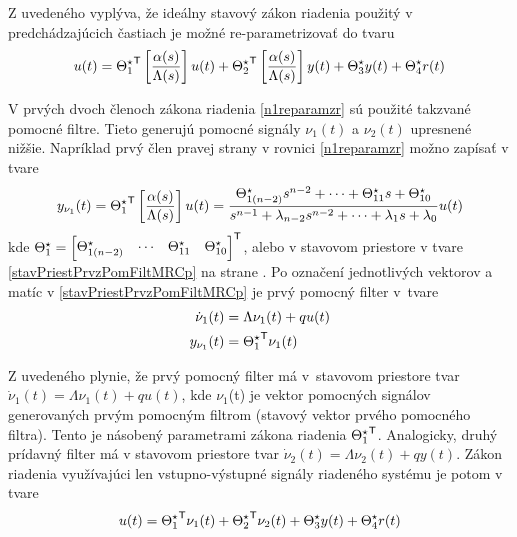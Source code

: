 \documentclass[a4paper, 10pt, ]{article}
\begin{document}
Z uvedeného vyplýva, že ideálny stavový zákon riadenia použitý v predchádzajúcich častiach je možné re-parametrizovať do tvaru
\begin{equation} \label{n1reparamzr}
	u(t)
	=
	{\Theta_1^\star}^{\mathsf{T}} \left[ \frac{\alpha(s)}{\Lambda(s)} \right] u(t)
	+
	{\Theta_2^\star}^{\mathsf{T}} \left[ \frac{\alpha(s)}{\Lambda(s)} \right] y(t)
	+
	\Theta_3^\star y(t)
	+
	\Theta_4^\star r(t)
\end{equation}






V prvých dvoch členoch zákona riadenia \eqref{n1reparamzr} sú použité takzvané pomocné filtre. Tieto generujú pomocné signály $\nu_1(t)$ a $\nu_2(t)$ upresnené nižšie. Napríklad prvý člen pravej strany v rovnici \eqref{n1reparamzr} možno zapísať v tvare
\begin{equation}
	y_{\nu_1}(t) = {\Theta_1^\star}^{\mathsf{T}} \left[\frac{\alpha(s)}{\Lambda(s)}\right] u(t)
	=
	\frac{
	\Theta_{1(n-2)}^\star s^{n-2}    + \cdots + \Theta_{11}^\star s + \Theta_{10}^\star
	}{
	s^{n-1}+ \lambda_{n-2} s^{n-2} + \cdots + \lambda_1 s + \lambda_0
	}
	u(t)
\end{equation}
kde $ \Theta_1^\star = \begin{bmatrix} \Theta_{1(n-2)}^\star  & \cdots & \Theta_{11}^\star & \Theta_{10}^\star \end{bmatrix}^{\mathsf{T}} $, alebo v stavovom priestore v tvare \eqref{stavPriestPrvzPomFiltMRCp} na strane \pageref{stavPriestPrvzPomFiltMRCp}. Po označení jednotlivých vektorov a matíc v \eqref{stavPriestPrvzPomFiltMRCp} je prvý pomocný filter v~tvare
\begin{subequations}
	\begin{align}
		\dot \nu_1(t)
		&=
		\Lambda
		\nu_1(t)
		+
		q
		u(t)
		\\
		y_{\nu_1}(t)
		&=
		{\Theta_1^\star}^{\mathsf{T}}
		\nu_1(t)
	\end{align}
\end{subequations}



Z uvedeného plynie, že prvý pomocný filter má v~stavovom priestore tvar $ \dot \nu_1(t) = \Lambda \nu_1(t) + q u(t) $, kde $\nu_1$(t) je vektor pomocných signálov generovaných prvým pomocným filtrom (stavový vektor prvého pomocného filtra). Tento je násobený parametrami zákona riadenia ${\Theta_1^\star}^{\mathsf{T}}$. Analogicky, druhý prídavný filter má v stavovom priestore tvar $ \dot{\nu}_2(t) = \Lambda \nu_2(t) + q y(t) $. Zákon riadenia využívajúci len vstupno-výstupné signály riadeného systému je potom v tvare
\begin{align} \label{zakriadspoz}
	u(t) = {\Theta_1^\star}^{\mathsf{T}} \nu_1(t) + {\Theta_2^\star}^{\mathsf{T}} \nu_2(t) + \Theta_3^\star y(t) + \Theta_4^\star r(t)
\end{align}
\end{document}

